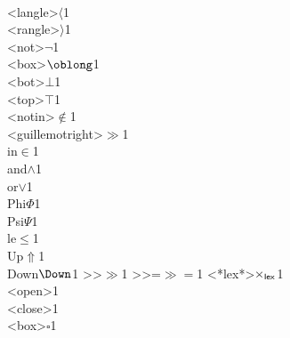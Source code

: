 {  {\\<langle>}{{$\langle$}}1
  {\\<rangle>}{{$\rangle$}}1
  {\\<not>}{{$\neg$}}1
  {\\<box>}{{$\oblong$}}1
  {\\<bot>}{{$\bot$}}1
  {\\<top>}{{$\top$}}1
  {\\<notin>}{{$\notin$}}1
  {\\<guillemotright>}{{$\gg$}}1
  {\\in}{$\in$}1
  {\\and}{$\wedge$}1
  {\\or}{$\vee$}1
  {\\Phi}{{$\Phi$}}1
  {\\Psi}{{$\Psi$}}1
  {\\le}{{$\le$}}1
  {\\Up}{{$\Uparrow$}}1
  {\\Down}{{$\Down$}}1
  {>>}{{$\gg$}}1
  {>>=}{{${\gg}{=}$}}1
  {<*lex*>}{{$\times_{\sf lex}$}}1
  {\\<open>}{{\rm\guilsinglleft}}1
  {\\<close>}{{\rm\guilsinglright}}1
  {\\<box>}{{$\square$}}1
}

\newcommand{\is}{\lstinline[language=isabelle]}
\newcommand{\q}[1]{\mbox{\guilsinglleft{#1}\hspace{-.0pt}\guilsinglright}}
\cMakeRobust\q
